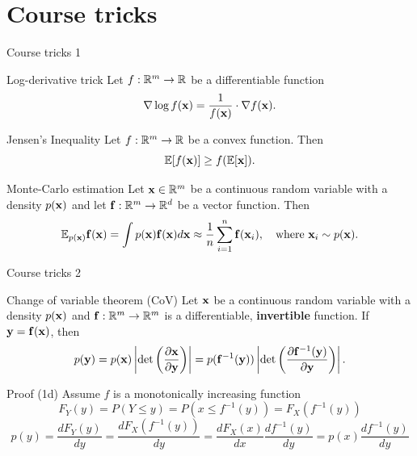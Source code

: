 \section{Course tricks}
\begin{frame}{Course tricks 1}
	\begin{block}{Log-derivative trick}
		Let $f: \mathbb{R}^m \rightarrow \mathbb{R}$ be a differentiable function
		\[
			\nabla \log f(\mathbf{x}) = \frac{1}{f(\mathbf{x})} \cdot \nabla f(\mathbf{x}).
		\]
		\vspace{-0.7cm}
	\end{block}
	\begin{block}{Jensen's Inequality}
		Let $f: \mathbb{R}^m \rightarrow \mathbb{R}$ be a convex function. Then
		\[
			\mathbb{E} [f(\mathbf{x})] \geq f(\mathbb{E}[\mathbf{x}]).
		\]
		\vspace{-0.7cm}
	\end{block}
	\begin{block}{Monte-Carlo estimation}
		Let $\mathbf{x} \in \mathbb{R}^m$ be a continuous random variable with a density $p(\mathbf{x})$ and let $\mathbf{f}: \mathbb{R}^m \rightarrow \mathbb{R}^d$ be a vector function. Then 
		\[
			\mathbb{E}_{p(\mathbf{x})} \mathbf{f}(\mathbf{x}) = \int p(\mathbf{x}) \mathbf{f}(\mathbf{x}) d \mathbf{x} \approx \frac{1}{n} \sum_{i=1}^n \mathbf{f}(\mathbf{x}_i), \quad 
			\text{where } \mathbf{x}_i \sim p(\mathbf{x}).
		\]
		\vspace{-0.4cm}
	\end{block}
\end{frame}
\begin{frame}{Course tricks 2}
	\begin{block}{Change of variable theorem (CoV)}
		Let $\mathbf{x}$ be a continuous random variable with a density $p(\mathbf{x})$ and $\mathbf{f}: \mathbb{R}^m \rightarrow \mathbb{R}^m$ is a differentiable, \textbf{invertible} function. If $\mathbf{y} = \mathbf{f}(\mathbf{x})$, then
		\[
			p(\mathbf{y}) = p(\mathbf{x}) \left|\det \left(  \frac{\partial \mathbf{x}}{\partial \mathbf{y}} \right) \right| = p(\mathbf{f}^{-1}(\mathbf{y})) \left|\det \left(  \frac{\partial \mathbf{f}^{-1}(\mathbf{y})}{\partial \mathbf{y}} \right) \right|.
		\]
		\vspace{-0.5cm}
	\end{block}
	\begin{block}{Proof (1d)}
		Assume $f$ is a monotonically increasing function
		\[
			F_Y(y) = P(Y \leq y) = P(x \leq f^{-1}(y)) = F_X(f^{-1}(y))
		\]
		\[
			p(y) = \frac{dF_Y(y)}{dy} = \frac{dF_X(f^{-1}(y))}{dy} = \frac{dF_X(x)}{dx} \frac{df^{-1}(y)}{dy} =  p(x) \frac{df^{-1}(y)}{dy}
		\]
	\end{block}
\end{frame}
